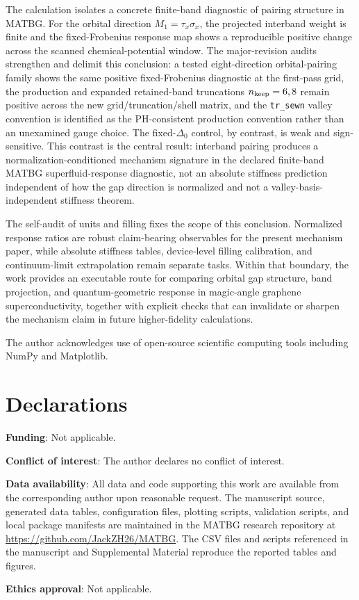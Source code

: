 \documentclass[aps,prb,reprint,superscriptaddress,floatfix,nofootinbib]{revtex4-2}
\begin{document}
The calculation isolates a concrete finite-band diagnostic of pairing
structure in MATBG.
For the orbital direction $M_1=\tau_x\sigma_x$, the projected interband weight
is finite and the fixed-Frobenius response map shows a reproducible positive
change across the scanned chemical-potential window.
The major-revision audits strengthen and delimit this conclusion: a tested
eight-direction orbital-pairing family shows the same positive fixed-Frobenius
diagnostic at the first-pass grid, the production and expanded retained-band
truncations $n_{\rm keep}=6,8$ remain positive across the new
grid/truncation/shell matrix, and the \texttt{tr\_sewn} valley convention is
identified as the PH-consistent production convention rather than an
unexamined gauge choice.
The fixed-$\Delta_0$ control, by contrast, is weak and sign-sensitive.
This contrast is the central result: interband pairing produces a
normalization-conditioned mechanism signature in the declared finite-band
MATBG superfluid-response diagnostic, not an absolute stiffness prediction
independent of how the gap direction is normalized and not a
valley-basis-independent stiffness theorem.

The self-audit of units and filling fixes the scope of this conclusion.
Normalized response ratios are robust claim-bearing observables for the
present mechanism paper, while absolute stiffness tables, device-level filling
calibration, and continuum-limit extrapolation remain separate tasks.
Within that boundary, the work provides an executable route for comparing
orbital gap structure, band projection, and quantum-geometric response in
magic-angle graphene superconductivity, together with explicit checks that can
invalidate or sharpen the mechanism claim in future higher-fidelity
calculations.

\begin{acknowledgments}
The author acknowledges use of open-source scientific computing tools
including NumPy and Matplotlib.
\end{acknowledgments}

\section*{Declarations}

\textbf{Funding}: Not applicable.

\textbf{Conflict of interest}: The author declares no conflict of interest.

\textbf{Data availability}: All data and code supporting this work are available
from the corresponding author upon reasonable request.  The manuscript source,
generated data tables, configuration files, plotting scripts, validation
scripts, and local package manifests are maintained in the MATBG research
repository at \url{https://github.com/JackZH26/MATBG}.  The CSV files and
scripts referenced in the manuscript and Supplemental Material reproduce the
reported tables and figures.

\textbf{Ethics approval}: Not applicable.


\end{document}
